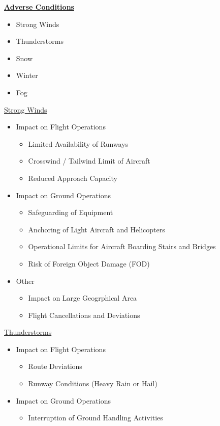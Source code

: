 \documentclass[9pt, landscape, fleqn]{scrartcl}
\begin{document}
\begin{multicols*}{3}
\underline{\textbf{Adverse Conditions}}
\begin{itemize}
    \item Strong Winds
    \item Thunderstorms 
    \item Snow 
    \item Winter 
    \item Fog 
\end{itemize}
\underline{Strong Winds}
\begin{itemize}
    \item Impact on Flight Operations
    \begin{itemize}
        \item Limited Availability of Runways
        \item Crosswind / Tailwind Limit of Aircraft
        \item Reduced Approach Capacity
    \end{itemize} 
    \item Impact on Ground Operations 
    \begin{itemize}
        \item Safeguarding of Equipment
        \item Anchoring of Light Aircraft and Helicopters
        \item Operational Limits for Aircraft Boarding Stairs and Bridges
        \item Risk of Foreign Object Damage (FOD)
    \end{itemize}
    \item Other 
    \begin{itemize}
        \item Impact on Large Geogrphical Area
        \item Flight Cancellations and Deviations
    \end{itemize}
\end{itemize}
\underline{Thunderstorms}
\begin{itemize}
    \item Impact on Flight Operations
    \begin{itemize}
        \item Route Deviations
        \item Runway Conditions (Heavy Rain or Hail)
    \end{itemize}
    \item Impact on Ground Operations 
    \begin{itemize}
        \item Interruption of Ground Handling Activities

\end{itemize}
\end{itemize}
\end{multicols*}
\end{document}
